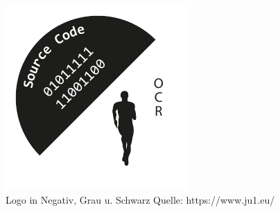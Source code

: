 \begin{figure}[H]
\begin{minipage}[b]{0.30\textwidth}
	\end{minipage}
	\hfill
	\begin{minipage}[b]{0.20\textwidth}
		\includegraphics[width=\textwidth]{content/bsp/Logo-SW.pdf}
	\end{minipage}
	\caption{Logo in Negativ, Grau u. Schwarz
		     \newline Quelle: https://www.ju1.eu/}
	\label{logo_negativ_grau_schwarz}
\end{figure}

